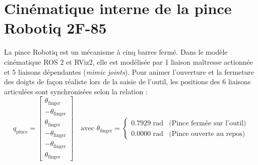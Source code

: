 \documentclass[11pt,a4paper]{report}
\begin{document}
\section{Cinématique interne de la pince Robotiq 2F-85}
La pince Robotiq est un mécanisme à cinq barres fermé. Dans le modèle cinématique ROS 2 et RViz2, elle est modélisée par 1 liaison maîtresse actionnée et 5 liaisons dépendantes (\textit{mimic joints}). Pour animer l'ouverture et la fermeture des doigts de façon réaliste lors de la saisie de l'outil, les positions des 6 liaisons articulées sont synchronisées selon la relation :
\begin{equation}
    q_{\text{pince}} = \begin{bmatrix}
        \theta_{\text{finger}} \\
        -\theta_{\text{finger}} \\
        \theta_{\text{finger}} \\
        -\theta_{\text{finger}} \\
        -\theta_{\text{finger}} \\
        \theta_{\text{finger}}
    \end{bmatrix}
    \quad \text{avec } \theta_{\text{finger}} = 
    \begin{cases}
        0.7929\text{ rad} & \text{(Pince fermée sur l'outil)} \\
        0.0000\text{ rad} & \text{(Pince ouverte au repos)}
    \end{cases}
\end{equation}
\end{document}

